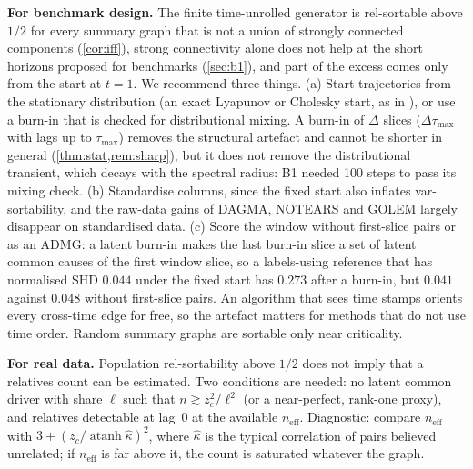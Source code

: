 \documentclass{article}
\theoremstyle{plain}
\theoremstyle{definition}
\theoremstyle{remark}
\newcommand{\neff}{n_{\mathrm{eff}}}
\newcommand{\atanh}{\operatorname{atanh}}
\begin{document}
\textbf{For benchmark design.} The finite time-unrolled generator is
rel-sortable above $1/2$ for every summary graph that is not a union of
strongly connected components (\cref{cor:iff}), strong connectivity alone does
not help at the short horizons proposed for benchmarks (\cref{sec:b1}), and
part of the excess comes only from the start at $t=1$. We recommend three
things. (a) Start trajectories from the stationary distribution (an exact
Lyapunov or Cholesky start, as in \citealp{herman2025unitless}), or use a
burn-in that is checked for distributional mixing. A burn-in of $\Delta$ slices
($\Delta\tau_{\max}$ with lags up to $\tau_{\max}$) removes the structural
artefact and cannot be shorter in general (\cref{thm:stat,rem:sharp}), but it
does not remove the distributional transient, which decays with the spectral
radius: B1 needed 100 steps to pass its mixing check. (b) Standardise columns,
since the fixed start also inflates var-sortability, and the raw-data gains of
DAGMA, NOTEARS and GOLEM largely disappear on standardised data. (c) Score the window without first-slice pairs
or as an ADMG: a latent burn-in makes the last burn-in slice a set of latent
common causes of the first window slice, so a labels-using reference that has
normalised SHD $0.044$ under the fixed start has $0.273$ after a burn-in, but
$0.041$ against $0.048$ without first-slice pairs. An algorithm that sees time
stamps orients every cross-time edge for free, so the artefact matters for
methods that do not use time order. Random summary graphs are sortable only
near criticality.

\textbf{For real data.} Population rel-sortability above $1/2$ does not imply
that a relatives count can be estimated. Two conditions are needed: no latent
common driver with share $\ell$ such that $n\gtrsim z_c^2/\ell^2$ (or a
near-perfect, rank-one proxy), and relatives detectable at lag~0 at the
available $\neff$. Diagnostic: compare $\neff$ with
$3+(z_c/\atanh\hat\kappa)^2$, where $\hat\kappa$ is the typical correlation of
pairs believed unrelated; if $\neff$ is far above it, the count is saturated
whatever the graph.
\end{document}
